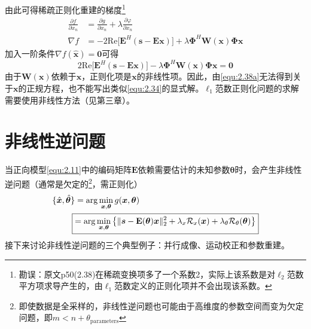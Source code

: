 \documentclass[12pt]{article}
\begin{document}
由此可得稀疏正则化重建的梯度\footnote{勘误：原文p50(2.38)在稀疏变换项多了一个系数2，实际上该系数是对$\ell_2$范数平方项求导产生的，由$\ell_1$范数定义的正则化项并不会出现该系数。}
\begin{align}
    \frac{\partial f}{\partial x_n}&=\frac{\partial g}{\partial x_n}+\lambda\frac{\partial\varphi}{\partial x_n} \\
    \nabla f&=-2\mathrm{Re}\big[\mathbf{E}^H(\bm{s}-\mathbf{E}\bm{x})\big]+\lambda\bm{\Phi}^H\mathbf{W}(\bm{x})\bm{\Phi}\bm{x}
    \label{equ:2.38}
\end{align}
加入一阶条件$\nabla f(\hat{\bm{x}})=\bm{0}$可得
\begin{equation}
    \boxed{2\mathrm{Re}\big[\mathbf{E}^H(\bm{s}-\mathbf{E}\bm{x})\big]-\lambda\bm{\Phi}^H\mathbf{W}(\bm{x})\bm{\Phi}\bm{x}=\bm{0}}
    \label{equ:2.38a}
\end{equation}
由于$\mathbf{W}(\bm{x})$依赖于$\bm{x}$，正则化项是$\bm{x}$的非线性项。因此，由\autoref{equ:2.38a}无法得到关于$\bm{x}$的正规方程，也不能写出类似\autoref{equ:2.34}的显式解。$\ell_1$范数正则化问题的求解需要使用非线性方法（见第三章）。

\section{非线性逆问题}
当正向模型\autoref{equ:2.11}中的编码矩阵$\mathbf{E}$依赖需要估计的未知参数$\bm{\theta}$时，会产生非线性逆问题（通常是欠定的\footnote{即使数据是全采样的，非线性逆问题也可能由于高维度的参数空间而变为欠定问题，即$m<n+\theta_{\text{parameters}}$}，需正则化）
\begin{equation}
    \begin{aligned}
        \{\hat{\bm{x}},\hat{\bm{\theta}}\}&=\arg\min_{\bm{x},\bm{\theta}}g(\bm{x},\bm{\theta}) \\
        \Aboxed{&=\arg\min_{\bm{x},\bm{\theta}}\left\{\|\bm{s}-\mathbf{E}(\bm{\theta})\bm{x}\|_2^2+\lambda_x\mathcal{R}_x(\bm{x})+\lambda_\theta \mathcal{R}_\theta(\bm{\theta})\right\}}
    \end{aligned}
    \label{equ:2.39}
\end{equation}
接下来讨论非线性逆问题的三个典型例子：并行成像、运动校正和参数重建。
\end{document}
